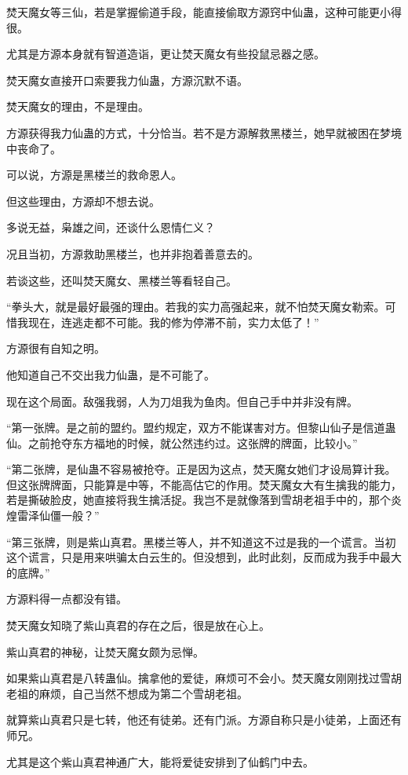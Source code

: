 \begin{this_body}
焚天魔女等三仙，若是掌握偷道手段，能直接偷取方源窍中仙蛊，这种可能更小得很。

尤其是方源本身就有智道造诣，更让焚天魔女有些投鼠忌器之感。

焚天魔女直接开口索要我力仙蛊，方源沉默不语。

焚天魔女的理由，不是理由。

方源获得我力仙蛊的方式，十分恰当。若不是方源解救黑楼兰，她早就被困在梦境中丧命了。

可以说，方源是黑楼兰的救命恩人。

但这些理由，方源却不想去说。

多说无益，枭雄之间，还谈什么恩情仁义？

况且当初，方源救助黑楼兰，也并非抱着善意去的。

若谈这些，还叫焚天魔女、黑楼兰等看轻自己。

“拳头大，就是最好最强的理由。若我的实力高强起来，就不怕焚天魔女勒索。可惜我现在，连逃走都不可能。我的修为停滞不前，实力太低了！”

方源很有自知之明。

他知道自己不交出我力仙蛊，是不可能了。

现在这个局面。敌强我弱，人为刀俎我为鱼肉。但自己手中并非没有牌。

“第一张牌。是之前的盟约。盟约规定，双方不能谋害对方。但黎山仙子是信道蛊仙。之前抢夺东方福地的时候，就公然违约过。这张牌的牌面，比较小。”

“第二张牌，是仙蛊不容易被抢夺。正是因为这点，焚天魔女她们才设局算计我。但这张牌牌面，只能算是中等，不能高估它的作用。焚天魔女大有生擒我的能力，若是撕破脸皮，她直接将我生擒活捉。我岂不是就像落到雪胡老祖手中的，那个炎煌雷泽仙僵一般？”

“第三张牌，则是紫山真君。黑楼兰等人，并不知道这不过是我的一个谎言。当初这个谎言，只是用来哄骗太白云生的。但没想到，此时此刻，反而成为我手中最大的底牌。”

方源料得一点都没有错。

焚天魔女知晓了紫山真君的存在之后，很是放在心上。

紫山真君的神秘，让焚天魔女颇为忌惮。

如果紫山真君是八转蛊仙。擒拿他的爱徒，麻烦可不会小。焚天魔女刚刚找过雪胡老祖的麻烦，自己当然不想成为第二个雪胡老祖。

就算紫山真君只是七转，他还有徒弟。还有门派。方源自称只是小徒弟，上面还有师兄。

尤其是这个紫山真君神通广大，能将爱徒安排到了仙鹤门中去。


\end{this_body}
